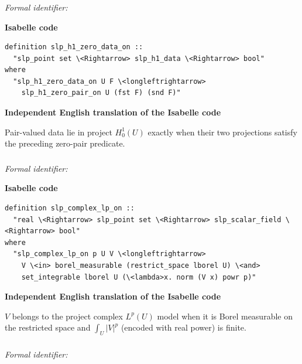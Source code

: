 \documentclass[10pt,oneside]{article}
\newcommand{\reviewlabel}[1]{\par\smallskip\noindent\textsf{\bfseries #1}\par\smallskip}
\begin{document}
\subsubsection{\texttt{}}
\noindent\textit{Formal identifier:} \texttt{}

\reviewlabel{Isabelle code}
\begin{lstlisting}
definition slp_h1_zero_data_on ::
  "slp_point set \<Rightarrow> slp_h1_data \<Rightarrow> bool"
where
  "slp_h1_zero_data_on U F \<longleftrightarrow>
    slp_h1_zero_pair_on U (fst F) (snd F)"
\end{lstlisting}

\reviewlabel{Independent English translation of the Isabelle code}
Pair-valued data lie in project $H^1_0(U)$ exactly when their two projections satisfy the preceding zero-pair predicate.

\subsubsection{\texttt{}}
\noindent\textit{Formal identifier:} \texttt{}

\reviewlabel{Isabelle code}
\begin{lstlisting}
definition slp_complex_lp_on ::
  "real \<Rightarrow> slp_point set \<Rightarrow> slp_scalar_field \<Rightarrow> bool"
where
  "slp_complex_lp_on p U V \<longleftrightarrow>
    V \<in> borel_measurable (restrict_space lborel U) \<and>
    set_integrable lborel U (\<lambda>x. norm (V x) powr p)"
\end{lstlisting}

\reviewlabel{Independent English translation of the Isabelle code}
$V$ belongs to the project complex $L^p(U)$ model when it is Borel measurable on the restricted space and $\int_U |V|^p$ (encoded with real power) is finite.

\subsubsection{\texttt{}}
\noindent\textit{Formal identifier:} \texttt{}
\end{document}
